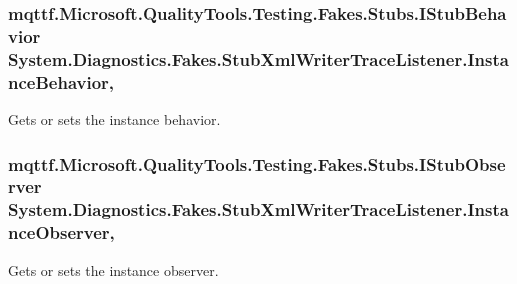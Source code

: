 \hypertarget{class_system_1_1_diagnostics_1_1_fakes_1_1_stub_xml_writer_trace_listener_a9bd7bbdd0ccb3d11332441d23e8db89b}{
\subsubsection[{Instance\-Behavior}]{\setlength{\rightskip}{0pt plus 5cm}mqttf.\-Microsoft.\-Quality\-Tools.\-Testing.\-Fakes.\-Stubs.\-I\-Stub\-Behavior System.\-Diagnostics.\-Fakes.\-Stub\-Xml\-Writer\-Trace\-Listener.\-Instance\-Behavior\hspace{0.3cm}{\ttfamily [get]}, {\ttfamily [set]}}}\label{class_system_1_1_diagnostics_1_1_fakes_1_1_stub_xml_writer_trace_listener_a9bd7bbdd0ccb3d11332441d23e8db89b}


Gets or sets the instance behavior.

\hypertarget{class_system_1_1_diagnostics_1_1_fakes_1_1_stub_xml_writer_trace_listener_aa9901c8be464559156828605fbe7b880}{
\subsubsection[{Instance\-Observer}]{\setlength{\rightskip}{0pt plus 5cm}mqttf.\-Microsoft.\-Quality\-Tools.\-Testing.\-Fakes.\-Stubs.\-I\-Stub\-Observer System.\-Diagnostics.\-Fakes.\-Stub\-Xml\-Writer\-Trace\-Listener.\-Instance\-Observer\hspace{0.3cm}{\ttfamily [get]}, {\ttfamily [set]}}}\label{class_system_1_1_diagnostics_1_1_fakes_1_1_stub_xml_writer_trace_listener_aa9901c8be464559156828605fbe7b880}


Gets or sets the instance observer.

